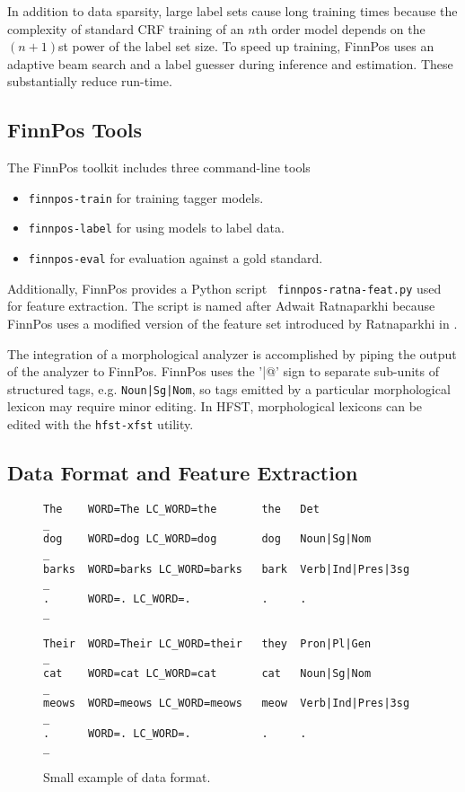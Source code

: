 \documentclass{llncs}
\begin{document}
In addition to data sparsity, large label sets cause long training
times because the complexity of standard CRF training of an $n$th
order model depends on the $(n+1)$st power of the label set size. To
speed up training, FinnPos uses an adaptive beam search and a label
guesser \cite{silfverberg/2015} during inference and estimation. These
substantially reduce run-time.

\subsection{FinnPos Tools}

The FinnPos toolkit includes three command-line tools

\begin{itemize}
\item {\tt finnpos-train} for training tagger models.
\item {\tt finnpos-label} for using models to label data.
\item {\tt finnpos-eval} for evaluation against a gold standard.
\end{itemize}

Additionally, FinnPos provides a Python script {\tt
  finnpos-ratna-feat.py} used for feature extraction. The script is
named after Adwait Ratnaparkhi because FinnPos uses a modified version
of the feature set introduced by Ratnaparkhi in
\cite{ratnaparkhi/1996}.

The integration of a morphological analyzer
is accomplished by piping the output of the analyzer to FinnPos. 
FinnPos uses the '\verb@|@' sign to separate sub-units
of structured tags, e.g. {\tt Noun|Sg|Nom}, so tags emitted 
by a particular morphological lexicon may require minor editing. 
In HFST, morphological lexicons can be edited with the {\tt hfst-xfst} utility.

\subsection{Data Format and Feature Extraction}

\begin{figure}
\begin{framed}
\begin{verbatim}
The    WORD=The LC_WORD=the       the   Det                _
dog    WORD=dog LC_WORD=dog       dog   Noun|Sg|Nom        _
barks  WORD=barks LC_WORD=barks   bark  Verb|Ind|Pres|3sg  _
.      WORD=. LC_WORD=.           .     .                  _

Their  WORD=Their LC_WORD=their   they  Pron|Pl|Gen        _
cat    WORD=cat LC_WORD=cat       cat   Noun|Sg|Nom        _
meows  WORD=meows LC_WORD=meows   meow  Verb|Ind|Pres|3sg  _
.      WORD=. LC_WORD=.           .     .                  _
\end{verbatim}
\end{framed}
\caption{Small example of data format.}
\end{figure}
\end{document}

